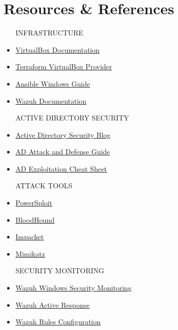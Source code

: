 \documentclass[11pt,a4paper]{article}
\begin{document}
\section{Resources \& References}
\begin{itemize}
    \item[INFRASTRUCTURE]
    \item \href{https://www.virtualbox.org/manual/UserManual.html}{VirtualBox Documentation}
    \item \href{https://www.terraform.io/docs/providers/vagrant/}{Terraform VirtualBox Provider}
    \item \href{https://docs.ansible.com/ansible/latest/os_guide/windows_usage.html}{Ansible Windows Guide}
    \item \href{https://documentation.wazuh.com/current/index.html}{Wazuh Documentation}

    \item[ACTIVE DIRECTORY SECURITY]
    \item \href{https://adsecurity.org/}{Active Directory Security Blog}
    \item \href{https://github.com/infosecn1nja/AD-Attack-Defense}{AD Attack and Defense Guide}
    \item \href{https://github.com/S1ckB0y1337/Active-Directory-Exploitation-Cheat-Sheet}{AD Exploitation Cheat Sheet}

    \item[ATTACK TOOLS]
    \item \href{https://github.com/PowerShellMafia/PowerSploit}{PowerSploit}
    \item \href{https://github.com/BloodHoundAD/BloodHound}{BloodHound}
    \item \href{https://github.com/SecureAuthCorp/impacket}{Impacket}
    \item \href{https://github.com/gentilkiwi/mimikatz}{Mimikatz}

    \item[SECURITY MONITORING]
    \item \href{https://documentation.wazuh.com/current/learning-wazuh/detect-windows-evading.html}{Wazuh Windows Security Monitoring}
    \item \href{https://documentation.wazuh.com/current/user-manual/capabilities/active-response/}{Wazuh Active Response}
    \item \href{https://documentation.wazuh.com/current/user-manual/ruleset/ruleset-xml-syntax.html}{Wazuh Rules Configuration}
\end{itemize}
\end{document}
